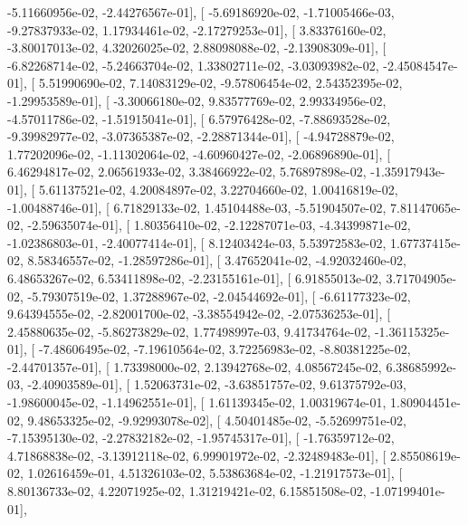 \documentclass{article}
\begin{document}
         -5.11660956e-02,  -2.44276567e-01],
       [ -5.69186920e-02,  -1.71005466e-03,  -9.27837933e-02,
          1.17934461e-02,  -2.17279253e-01],
       [  3.83376160e-02,  -3.80017013e-02,   4.32026025e-02,
          2.88098088e-02,  -2.13908309e-01],
       [ -6.82268714e-02,  -5.24663704e-02,   1.33802711e-02,
         -3.03093982e-02,  -2.45084547e-01],
       [  5.51990690e-02,   7.14083129e-02,  -9.57806454e-02,
          2.54352395e-02,  -1.29953589e-01],
       [ -3.30066180e-02,   9.83577769e-02,   2.99334956e-02,
         -4.57011786e-02,  -1.51915041e-01],
       [  6.57976428e-02,  -7.88693528e-02,  -9.39982977e-02,
         -3.07365387e-02,  -2.28871344e-01],
       [ -4.94728879e-02,   1.77202096e-02,  -1.11302064e-02,
         -4.60960427e-02,  -2.06896890e-01],
       [  6.46294817e-02,   2.06561933e-02,   3.38466922e-02,
          5.76897898e-02,  -1.35917943e-01],
       [  5.61137521e-02,   4.20084897e-02,   3.22704660e-02,
          1.00416819e-02,  -1.00488746e-01],
       [  6.71829133e-02,   1.45104488e-03,  -5.51904507e-02,
          7.81147065e-02,  -2.59635074e-01],
       [  1.80356410e-02,  -2.12287071e-03,  -4.34399871e-02,
         -1.02386803e-01,  -2.40077414e-01],
       [  8.12403424e-03,   5.53972583e-02,   1.67737415e-02,
          8.58346557e-02,  -1.28597286e-01],
       [  3.47652041e-02,  -4.92032460e-02,   6.48653267e-02,
          6.53411898e-02,  -2.23155161e-01],
       [  6.91855013e-02,   3.71704905e-02,  -5.79307519e-02,
          1.37288967e-02,  -2.04544692e-01],
       [ -6.61177323e-02,   9.64394555e-02,  -2.82001700e-02,
         -3.38554942e-02,  -2.07536253e-01],
       [  2.45880635e-02,  -5.86273829e-02,   1.77498997e-03,
          9.41734764e-02,  -1.36115325e-01],
       [ -7.48606495e-02,  -7.19610564e-02,   3.72256983e-02,
         -8.80381225e-02,  -2.44701357e-01],
       [  1.73398000e-02,   2.13942768e-02,   4.08567245e-02,
          6.38685992e-03,  -2.40903589e-01],
       [  1.52063731e-02,  -3.63851757e-02,   9.61375792e-03,
         -1.98600045e-02,  -1.14962551e-01],
       [  1.61139345e-02,   1.00319674e-01,   1.80904451e-02,
          9.48653325e-02,  -9.92993078e-02],
       [  4.50401485e-02,  -5.52699751e-02,  -7.15395130e-02,
         -2.27832182e-02,  -1.95745317e-01],
       [ -1.76359712e-02,   4.71868838e-02,  -3.13912118e-02,
          6.99901972e-02,  -2.32489483e-01],
       [  2.85508619e-02,   1.02616459e-01,   4.51326103e-02,
          5.53863684e-02,  -1.21917573e-01],
       [  8.80136733e-02,   4.22071925e-02,   1.31219421e-02,
          6.15851508e-02,  -1.07199401e-01],
\end{document}
